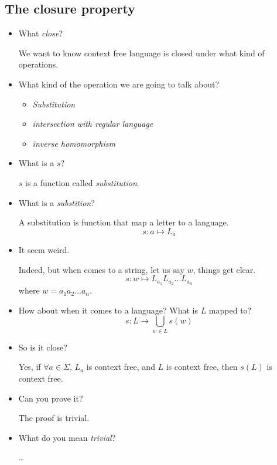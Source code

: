\documentclass[../main.tex]{subfiles}
\begin{document}
\subsection{The closure property}
\begin{itemize}
\item What \emph{close}? 

We want to know context free language is closed under what kind of operations.

\item What kind of the operation we are going to talk about? 

\begin{itemize}
\item \emph{Substitution}
\item \emph{intersection with regular language}
\item \emph{inverse homomorphism}
\end{itemize}

\item What is a \(s\)? 

\(s\) is a function called \emph{substitution}. 

\item What is a \emph{substition}? 

A substitution is function that 
map a letter to a language. 
\[
s \colon a \mapsto L_{a}
\]

\item It seem weird. 

Indeed, but when comes to a string, let us say \(w\), things get
clear. 
\[
s \colon w \mapsto L_{a_1}L_{a_2}\dots L_{a_{n}}
\]
where \(w = a_1 a_2 \dots a_{n}\).

\item How about when it comes to a language? What is \(L\) mapped to? 
\[
	s \colon L \to \bigcup_{w \in L} s (w)
\]

\item So is it close? 

Yes, if \( \forall a \in \Sigma\), \(L _{a}\) is context free,
		and \(L\) is context free, then \(s (L)\) is 
		context free.

\item Can you prove it? 

The proof is trivial.

\item What do you mean \emph{trivial}? 

	\dots
\end{itemize}
\end{document}
